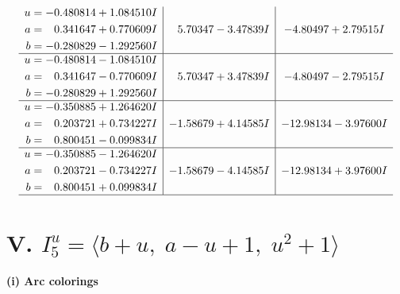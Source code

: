 \documentclass[1p]{elsarticle_modified}
\theoremstyle{definition}
\begin{document}
$$\begin{array}{c|c|c}
\begin{aligned}
u &= -0.480814 + 1.084510 I \\
a &= \phantom{-}0.341647 + 0.770609 I \\
b &= -0.280829 - 1.292560 I\end{aligned}
 & \phantom{-}5.70347 - 3.47839 I & -4.80497 + 2.79515 I \\ \hline\begin{aligned}
u &= -0.480814 - 1.084510 I \\
a &= \phantom{-}0.341647 - 0.770609 I \\
b &= -0.280829 + 1.292560 I\end{aligned}
 & \phantom{-}5.70347 + 3.47839 I & -4.80497 - 2.79515 I \\ \hline\begin{aligned}
u &= -0.350885 + 1.264620 I \\
a &= \phantom{-}0.203721 + 0.734227 I \\
b &= \phantom{-}0.800451 - 0.099834 I\end{aligned}
 & -1.58679 + 4.14585 I & -12.98134 - 3.97600 I \\ \hline\begin{aligned}
u &= -0.350885 - 1.264620 I \\
a &= \phantom{-}0.203721 - 0.734227 I \\
b &= \phantom{-}0.800451 + 0.099834 I\end{aligned}
 & -1.58679 - 4.14585 I & -12.98134 + 3.97600 I\\
 \hline 
 \end{array}$$\newpage\newpage\renewcommand{\arraystretch}{1}
\centering \section*{V. $I^u_{5}= \langle b+u,\;a- u+1,\;u^2+1 \rangle$}
\flushleft \textbf{(i) Arc colorings}\\
\end{document}
